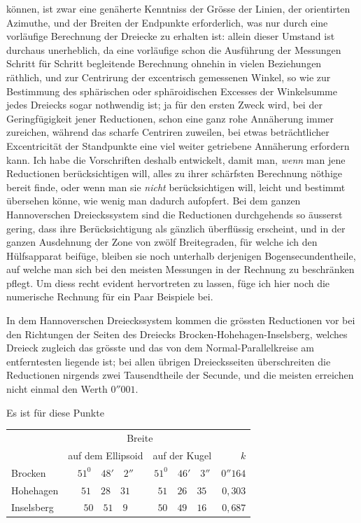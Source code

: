 %
können, ist zwar eine genäherte Kenntniss der Grösse der Linien, der orientirten Azimuthe, und der Breiten der Endpunkte erforderlich, was nur durch eine vorläufige Berechnung der Dreiecke zu erhalten ist: allein dieser Umstand ist durchaus unerheblich, da eine vorläufige schon die Ausführung der Messungen Schritt für Schritt begleitende Berechnung ohnehin in vielen Beziehungen räthlich, und zur Centrirung der excentrisch gemessenen Winkel, so wie zur Bestimmung des sphärischen oder sphäroidischen Excesses der Winkelsumme jedes Dreiecks sogar nothwendig ist; ja für den ersten Zweck wird, bei der Geringfügigkeit jener Reductionen, schon eine ganz rohe Annäherung immer zureichen, während das scharfe Centriren zuweilen, bei etwas beträchtlicher Excentricität der Standpunkte eine viel weiter getriebene Annäherung erfordern kann. Ich habe die Vorschriften deshalb entwickelt, damit man, \textit{wenn} man jene Reductionen berücksichtigen will, alles zu ihrer schärfsten Berechnung nöthige bereit finde, oder wenn man sie \textit{nicht} berücksichtigen will, leicht und bestimmt übersehen könne, wie wenig man dadurch aufopfert. Bei dem ganzen Hannoverschen Dreieckssystem sind die Reductionen durchgehends so äusserst gering, dass ihre Berücksichtigung als gänzlich überflüssig erscheint, und in der ganzen Ausdehnung der Zone von zwölf Breitegraden, für welche ich den Hülfsapparat beifüge, bleiben sie noch unterhalb derjenigen Bogensecundentheile, auf welche man sich bei den meisten Messungen in der Rechnung zu beschränken pflegt. Um diess recht evident hervortreten zu lassen, füge ich hier noch die numerische Rechnung für ein Paar Beispiele bei.

In dem Hannoverschen Dreieckssystem kommen die grössten Reductionen vor bei den Richtungen der Seiten des Dreiecks Brocken-Hohehagen-Inselsberg, welches Dreieck zugleich das grösste und das von dem Normal-Parallelkreise am entferntesten liegende ist; bei allen übrigen Dreiecksseiten überschreiten die Reductionen nirgends zwei Tausendtheile der Secunde, und die meisten erreichen nicht einmal den Werth \(0''001\).

Es ist für diese Punkte
\begin{center}
\begin{tabular}{l|c|c|r}
&\multicolumn{2}{c|}{Breite}&\\
&auf dem Ellipsoid&auf der Kugel&\(k\)\\\hline
Brocken&\(51^0\quad48'\quad2''\)&\(51^0\quad46'\quad3''\)&\(0''164\)\\
Hohehagen&\(51\quad28\quad31\)&\(51\quad26\quad35\)&\(0{,}303\)\\
Inselsberg&\(50\quad51\quad9\)&\(50\quad49\quad16\)&\(0{,}687\)
\end{tabular}
\end{center}
